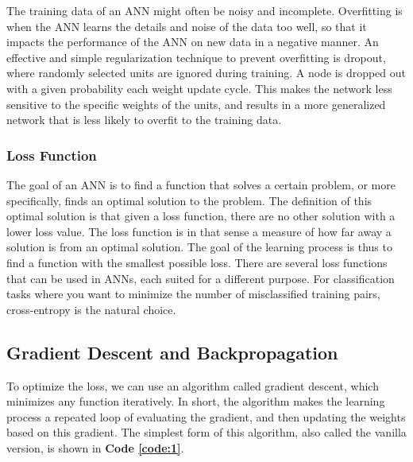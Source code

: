 The training data of an ANN might often be noisy and incomplete. Overfitting is when the ANN learns the details and noise of the data too well, so that it impacts the performance of the ANN on new data in a negative manner. An effective and simple regularization technique to prevent overfitting is dropout, where randomly selected units are ignored during training. A node is dropped out with a given probability each weight update cycle. This makes the network less sensitive to the specific weights of the units, and results in a more generalized network that is less likely to overfit to the training data.



\subsubsection{Loss Function}

\noindent The goal of an ANN is to find a function that solves a certain problem, or more specifically, finds an optimal solution to the problem. The definition of this optimal solution is that given a loss function, there are no other solution with a lower loss value. The loss function is in that sense a measure of how far away a solution is from an optimal solution. The goal of the learning process is thus to find a function with the smallest possible loss. There are several loss functions that can be used in ANNs, each suited for a different purpose. For classification tasks where you want to minimize the number of misclassified training pairs, cross-entropy is the natural choice.


\subsection{Gradient Descent and Backpropagation}

\noindent To optimize the loss, we can use an algorithm called gradient descent, which minimizes any function iteratively. In short, the algorithm makes the learning process a repeated loop of evaluating the gradient, and then updating the weights based on this gradient. The simplest form of this algorithm, also called the vanilla version, is shown in \textbf{Code \ref{code:1}}. \\


